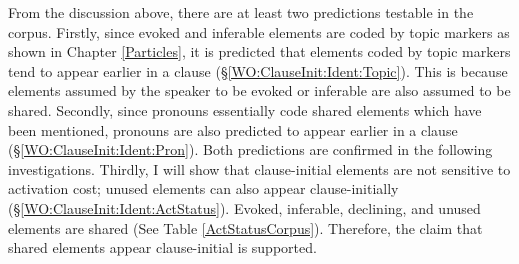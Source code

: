 %
%
%

From the discussion above,
there are at least two predictions testable in the corpus.
Firstly, since evoked and inferable elements are coded by topic markers as shown in Chapter \ref{Particles},
it is predicted that
elements coded by topic markers tend to appear earlier in a clause (\S \ref{WO:ClauseInit:Ident:Topic}).
This is because elements assumed by the speaker to be evoked or inferable
are also assumed to be shared.
Secondly,
since pronouns essentially code shared elements which have been mentioned,
pronouns are also predicted to appear earlier in a clause (\S \ref{WO:ClauseInit:Ident:Pron}).
Both predictions are confirmed in the following investigations.
Thirdly, I will show that clause-initial elements are not sensitive to activation cost;
unused elements can also appear clause-initially (\S \ref{WO:ClauseInit:Ident:ActStatus}).
Evoked, inferable, declining, and unused elements are shared
(See Table \ref{ActStatusCorpus}).
Therefore, the claim that shared elements appear clause-initial is supported.

